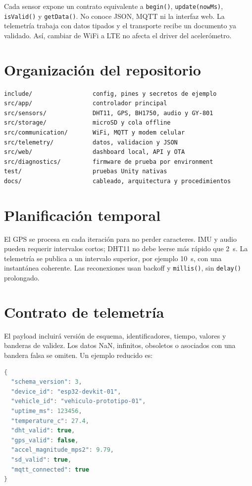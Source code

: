 \documentclass[11pt,a4paper,oneside]{report}
\begin{document}
Cada sensor expone un contrato equivalente a \texttt{begin()},
\texttt{update(nowMs)}, \texttt{isValid()} y \texttt{getData()}. No conoce JSON,
MQTT ni la interfaz web. La telemetría trabaja con datos tipados y el transporte
recibe un documento ya validado. Así, cambiar de WiFi a LTE no afecta el driver del
acelerómetro.

\section{Organización del repositorio}
\begin{lstlisting}
include/                 config, pines y secretos de ejemplo
src/app/                 controlador principal
src/sensors/             DHT11, GPS, BH1750, audio y GY-801
src/storage/             microSD y cola offline
src/communication/       WiFi, MQTT y modem celular
src/telemetry/           datos, validacion y JSON
src/web/                 dashboard local, API y OTA
src/diagnostics/         firmware de prueba por environment
test/                    pruebas Unity nativas
docs/                    cableado, arquitectura y procedimientos
\end{lstlisting}

\section{Planificación temporal}
El GPS se procesa en cada iteración para no perder caracteres. IMU y audio pueden
requerir intervalos cortos; DHT11 no debe leerse más rápido que 2~s. La telemetría se
publica a un intervalo superior, por ejemplo 10~s, con una instantánea coherente. Las
reconexiones usan backoff y \texttt{millis()}, sin \texttt{delay()} prolongado.

\section{Contrato de telemetría}
El payload incluirá versión de esquema, identificadores, tiempo, valores y banderas de
validez. Los datos NaN, infinitos, obsoletos o asociados con una bandera falsa se
omiten. Un ejemplo reducido es:

\begin{lstlisting}[language={C++}]
{
  "schema_version": 3,
  "device_id": "esp32-devkit-01",
  "vehicle_id": "vehiculo-prototipo-01",
  "uptime_ms": 123456,
  "temperature_c": 27.4,
  "dht_valid": true,
  "gps_valid": false,
  "accel_magnitude_mps2": 9.79,
  "sd_valid": true,
  "mqtt_connected": true
}
\end{lstlisting}
\end{document}
